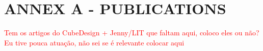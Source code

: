
\renewcommand{\thechapter}{}%
\chapter{ANNEX A - PUBLICATIONS}
\label{anexoA}
\renewcommand{\thechapter}{A}


\textcolor{red}{Tem os artigos do CubeDesign + Jenny/LIT que faltam aqui, coloco eles ou não? Eu tive pouca atuação, não sei se é relevante colocar aqui}
